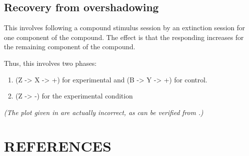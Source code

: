 \documentclass[11pt]{article}
\begin{document}
\begin{center}

\end{center}

\newpage

\subsection{Recovery from overshadowing}
\label{sec:org4ded6ed}

This involves following a compound stimulus session by an extinction session for one component of the compound. The effect is that the responding increases for the remaining component of the compound. 

Thus, this involves two phases:

\begin{enumerate}
\item (Z -> X -> +) for experimental and (B -> Y -> +) for control.
\item (Z -> -) for the experimental condition
\end{enumerate}

\emph{(The plot given in \cite{Gershman2015} are actually incorrect, as can be verified from \cite{Shevill2004}.)}

\begin{center}

\end{center}

\section{REFERENCES}
\label{sec:org42c593a}

\printbibliography[heading=none]
\end{document}

